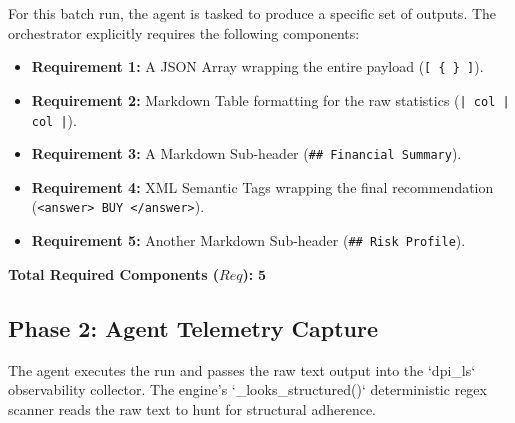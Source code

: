 \documentclass[11pt,a4paper]{article}
\begin{document}
\begin{tcolorbox}[enhanced, colback=dpicloud!5!white, colframe=dpiblue, title={\textbf{Phase 1: Enterprise Schema Requirements}}, fonttitle=\bfseries]
For this batch run, the agent is tasked to produce a specific set of outputs. The orchestrator explicitly requires the following components:
\begin{itemize}
    \item \textbf{Requirement 1:} A JSON Array wrapping the entire payload (\texttt{[ \{ \} ]}).
    \item \textbf{Requirement 2:} Markdown Table formatting for the raw statistics (\texttt{| col | col |}).
    \item \textbf{Requirement 3:} A Markdown Sub-header (\texttt{\#\# Financial Summary}).
    \item \textbf{Requirement 4:} XML Semantic Tags wrapping the final recommendation (\texttt{<answer> BUY </answer>}).
    \item \textbf{Requirement 5:} Another Markdown Sub-header (\texttt{\#\# Risk Profile}).
\end{itemize}
\textbf{Total Required Components ($Req$):} $\mathbf{5}$
\end{tcolorbox}

\newpage

\subsection{Phase 2: Agent Telemetry Capture}

The agent executes the run and passes the raw text output into the `dpi\_ls` observability collector. The engine's `\_looks\_structured()` deterministic regex scanner reads the raw text to hunt for structural adherence.
\end{document}

